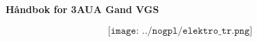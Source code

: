 \documentclass[10pt,a5paper,norsk]{article}
\begin{document}
\huge
\begin{center}
\textbf{Håndbok for 3AUA Gand VGS} \bigskip
\end{center}

\vskip 0.75cm
		$$\texttt{[image: ../nogpl/elektro\_tr.png]}$$
\normalsize
\vfil \eject









\vfil \eject
\end{document}
